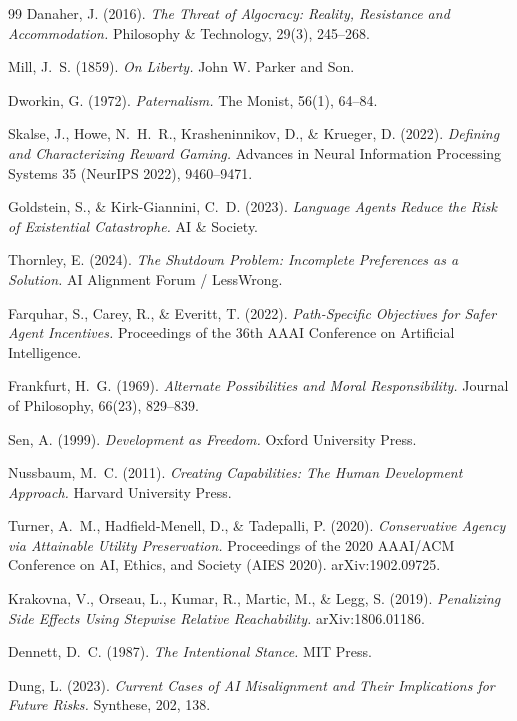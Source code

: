 \documentclass[11pt]{article}
\theoremstyle{definition}
\begin{document}
\begin{thebibliography}{99}
Danaher, J. (2016). \emph{The Threat of Algocracy: Reality, Resistance and Accommodation.} Philosophy \& Technology, 29(3), 245--268.

Mill, J.~S. (1859). \emph{On Liberty.} John W. Parker and Son.

Dworkin, G. (1972). \emph{Paternalism.} The Monist, 56(1), 64--84.

Skalse, J., Howe, N.~H.~R., Krasheninnikov, D., \& Krueger, D. (2022). \emph{Defining and Characterizing Reward Gaming.} Advances in Neural Information Processing Systems 35 (NeurIPS 2022), 9460--9471.

Goldstein, S., \& Kirk-Giannini, C.~D. (2023). \emph{Language Agents Reduce the Risk of Existential Catastrophe.} AI \& Society.

Thornley, E. (2024). \emph{The Shutdown Problem: Incomplete Preferences as a Solution.} AI Alignment Forum / LessWrong.

Farquhar, S., Carey, R., \& Everitt, T. (2022). \emph{Path-Specific Objectives for Safer Agent Incentives.} Proceedings of the 36th AAAI Conference on Artificial Intelligence.

Frankfurt, H.~G. (1969). \emph{Alternate Possibilities and Moral Responsibility.} Journal of Philosophy, 66(23), 829--839.

Sen, A. (1999). \emph{Development as Freedom.} Oxford University Press.

Nussbaum, M.~C. (2011). \emph{Creating Capabilities: The Human Development Approach.} Harvard University Press.

Turner, A.~M., Hadfield-Menell, D., \& Tadepalli, P. (2020). \emph{Conservative Agency via Attainable Utility Preservation.} Proceedings of the 2020 AAAI/ACM Conference on AI, Ethics, and Society (AIES 2020). arXiv:1902.09725.

Krakovna, V., Orseau, L., Kumar, R., Martic, M., \& Legg, S. (2019). \emph{Penalizing Side Effects Using Stepwise Relative Reachability.} arXiv:1806.01186.

Dennett, D.~C. (1987). \emph{The Intentional Stance.} MIT Press.

Dung, L. (2023). \emph{Current Cases of AI Misalignment and Their Implications for Future Risks.} Synthese, 202, 138.


\end{thebibliography}
\end{document}
